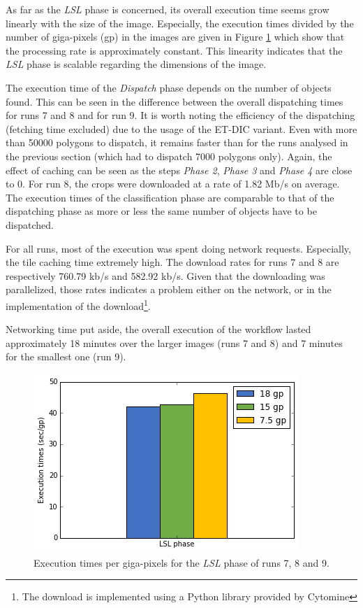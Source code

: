 As far as the \textit{LSL} phase is concerned, its overall execution time seems grow linearly with the size of the image. Especially, the execution times divided by the number of giga-pixels (gp) in the images are given in Figure \ref{fig:perf_lsl_sec_gp} which show that the processing rate is approximately constant. This linearity indicates that the \textit{LSL} phase is scalable regarding the dimensions of the image.

The execution time of the \textit{Dispatch} phase depends on the number of objects found. This can be seen in the difference between the overall dispatching times for runs 7 and 8 and for run 9. It is worth noting the efficiency of the dispatching (fetching time excluded) due to the usage of the ET-DIC variant. Even with more than 50000 polygons to dispatch, it remains faster than for the runs analysed in the previous section (which had to dispatch 7000 polygons only). Again, the effect of caching can be seen as the steps \textit{Phase 2}, \textit{Phase 3} and \textit{Phase 4} are close to 0. For run 8, the crops were downloaded at a rate of 1.82 Mb/s on average. The execution times of the classification phase are comparable to that of the dispatching phase as more or less the same number of objects have to be dispatched.

For all runs, most of the execution was spent doing network requests. Especially, the tile caching time extremely high. The download rates for runs 7 and 8 are respectively 760.79 kb/s and 582.92 kb/s. Given that the downloading was parallelized, those rates indicates a problem either on the network, or in the implementation of the download\footnote{The download is implemented using a Python library provided by Cytomine}.

Networking time put aside, the overall execution of the workflow lasted approximately 18 minutes over the larger images (runs 7 and 8) and 7 minutes for the smallest one (run 9). 

\begin{figure}
	\center
	\includegraphics[scale=0.5]{image/perf_lsl_sec_gp.png}
	\caption{Execution times per giga-pixels for the \textit{LSL} phase of runs 7, 8 and 9.}
	\label{fig:perf_lsl_sec_gp}
\end{figure}

